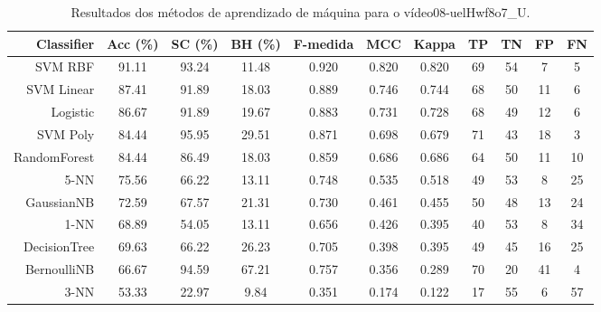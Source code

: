 \begin{table}[!htb]
\centering
\caption{Resultados dos métodos de aprendizado de máquina para o vídeo08-uelHwf8o7_U.}
\label{tab:08-uelHwf8o7_U}
\begin{tabular}{r|c|c|c|c|c|c|c|c|c|c}
\hline\hline
Classifier & Acc (\%) & SC (\%) & BH (\%) & F-medida & MCC & Kappa & TP & TN & FP & FN \\ \hline
SVM RBF & 91.11 & 93.24 & 11.48 & 0.920 & 0.820 & 0.820 & 69 & 54 & 7 & 5 \\ 
SVM Linear & 87.41 & 91.89 & 18.03 & 0.889 & 0.746 & 0.744 & 68 & 50 & 11 & 6 \\ 
Logistic & 86.67 & 91.89 & 19.67 & 0.883 & 0.731 & 0.728 & 68 & 49 & 12 & 6 \\ 
SVM Poly & 84.44 & 95.95 & 29.51 & 0.871 & 0.698 & 0.679 & 71 & 43 & 18 & 3 \\ 
RandomForest & 84.44 & 86.49 & 18.03 & 0.859 & 0.686 & 0.686 & 64 & 50 & 11 & 10 \\ 
5-NN & 75.56 & 66.22 & 13.11 & 0.748 & 0.535 & 0.518 & 49 & 53 & 8 & 25 \\ 
GaussianNB & 72.59 & 67.57 & 21.31 & 0.730 & 0.461 & 0.455 & 50 & 48 & 13 & 24 \\ 
1-NN & 68.89 & 54.05 & 13.11 & 0.656 & 0.426 & 0.395 & 40 & 53 & 8 & 34 \\ 
DecisionTree & 69.63 & 66.22 & 26.23 & 0.705 & 0.398 & 0.395 & 49 & 45 & 16 & 25 \\ 
BernoulliNB & 66.67 & 94.59 & 67.21 & 0.757 & 0.356 & 0.289 & 70 & 20 & 41 & 4 \\ 
3-NN & 53.33 & 22.97 & 9.84 & 0.351 & 0.174 & 0.122 & 17 & 55 & 6 & 57 \\ 
\hline\hline
\end{tabular}
\end{table}
